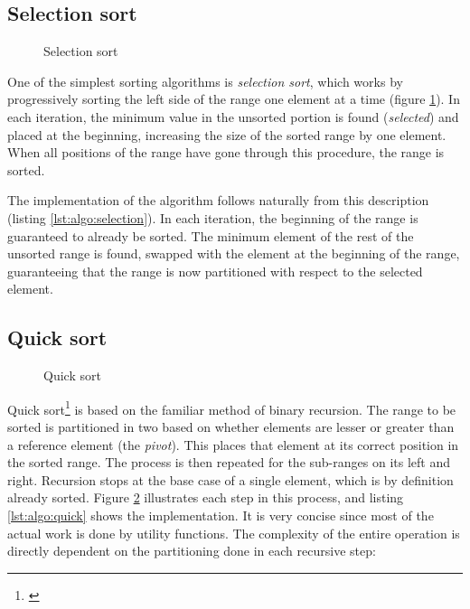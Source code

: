 \subsection{Selection sort}

\begin{figure}[p]
    \centering
    
    \vspace{2\baselineskip}
    
    \caption{Selection sort}
    \label{fig:algo:selection}
\end{figure}

One of the simplest sorting algorithms is \textit{selection sort}, which works
by progressively sorting the left side of the range one element at a time
(figure \ref{fig:algo:selection}).  In each iteration, the minimum value in the
unsorted portion is found (\emph{selected}) and placed at the beginning,
increasing the size of the sorted range by one element.  When all positions of
the range have gone through this procedure, the range is sorted.

The implementation of the algorithm follows naturally from this description
(listing \ref{lst:algo:selection}).  In each iteration, the beginning of the
range is guaranteed to already be sorted.  The minimum element of the rest of
the unsorted range is found, swapped with the element at the beginning of the
range, guaranteeing that the range is now partitioned with respect to the
selected element.

\subsection{Quick sort}

\begin{figure}[p]
    \centering
    
    \vspace{2\baselineskip}
    
    \caption{Quick sort}
    \label{fig:algo:quick}
\end{figure}

Quick sort\footnote{\cite{Hoare1962}} is based on the familiar method of binary
recursion.  The range to be sorted is partitioned in two based on whether
elements are lesser or greater than a reference element (the \textit{pivot}).
This places that element at its correct position in the sorted range.  The
process is then repeated for the sub-ranges on its left and right.  Recursion
stops at the base case of a single element, which is by definition already
sorted.  Figure \ref{fig:algo:quick} illustrates each step in this
process\footnotemark, and listing \ref{lst:algo:quick} shows the implementation.
It is very concise since most of the actual work is done by utility functions.
The complexity of the entire operation is directly dependent on the partitioning
done in each recursive step:

